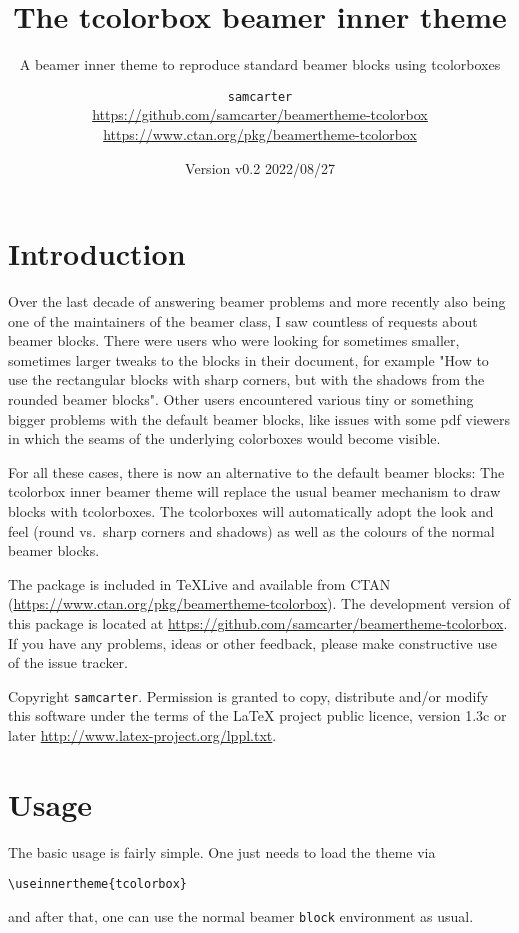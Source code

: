 \documentclass[parskip=half]{scrartcl}
\title{The tcolorbox beamer inner theme}
\subtitle{A beamer inner theme to reproduce standard beamer blocks using tcolorboxes}
\author{%
	\texorpdfstring{
		\texttt{samcarter}\\
		\url{https://github.com/samcarter/beamertheme-tcolorbox}\\
		\url{https://www.ctan.org/pkg/beamertheme-tcolorbox}
	}{samcarter}}
\date{Version v0.2 \textendash{} 2022/08/27}
\begin{document}
\maketitle

\section{Introduction}
\label{intro}

Over the last decade of answering beamer problems and more recently also being one of the maintainers of the beamer class, I saw countless of requests about beamer blocks. There were users who were looking for sometimes smaller, sometimes larger tweaks to the blocks in their document, for example "How to use the rectangular blocks with sharp corners, but with the shadows from the rounded beamer blocks". Other users encountered various tiny or something bigger problems with the default beamer blocks, like issues with some pdf viewers in which the seams of the underlying colorboxes would become visible. 

For all these cases, there is now an alternative to the default beamer blocks: The tcolorbox inner beamer theme will replace the usual beamer mechanism to draw blocks with tcolorboxes. The tcolorboxes will automatically adopt the look and feel (round vs.\ sharp corners and shadows) as well as the colours of the normal beamer blocks.

The package is included in \TeX{}Live 
and available from \textsc{CTAN} (\url{https://www.ctan.org/pkg/beamertheme-tcolorbox}). 
The development version of this package is located at \url{https://github.com/samcarter/beamertheme-tcolorbox}. If you have any problems, ideas or other feedback, please make constructive use of the issue tracker.

Copyright  \texttt{samcarter}. Permission is granted to copy, distribute and\slash or modify this software under the terms of the LaTeX project public licence, version 1.3c or later \url{http://www.latex-project.org/lppl.txt}.

\section{Usage}

The basic usage is fairly simple. One just needs to load the theme via 
\begin{tcolorbox}[title={}]
\begin{lstlisting}
\useinnertheme{tcolorbox}
\end{lstlisting}
\end{tcolorbox}
and after that, one can use the normal beamer \lstinline|block| environment as usual. 
\end{document}
